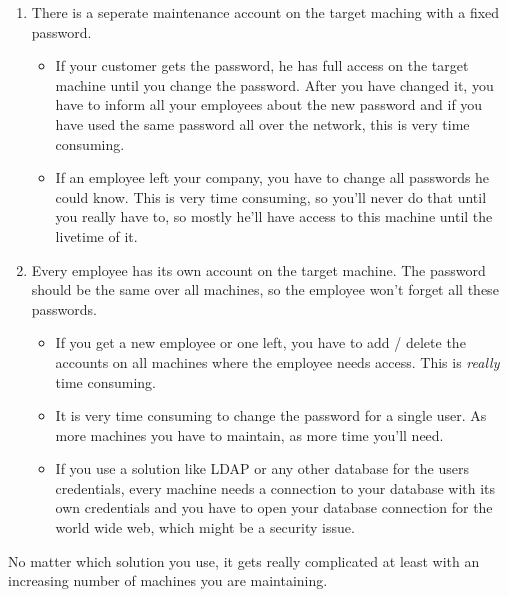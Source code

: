 \begin{enumerate}
	\item There is a seperate maintenance account on the target maching with a
		fixed password.
		\begin{itemize}
			\item If your customer gets the password, he has full access on the
				target machine until you change the password. After you have
				changed it, you have to inform all your employees about the new
				password and if you have used the same password all over the
				network, this is very time consuming.
			\item If an employee left your company, you have to change all
				passwords he could know. This is very time consuming, so you'll
				never do that until you really have to, so mostly he'll have
				access to this machine until the livetime of it.
		\end{itemize}

	\item Every employee has its own account on the target machine. The
		password should be the same over all machines, so the employee won't
		forget all these passwords.
		\begin{itemize}
			\item If you get a new employee or one left, you have to add /
				delete the accounts on all machines where the employee needs
				access. This is \textit{really} time consuming.
			\item It is very time consuming to change the password for a single
				user. As more machines you have to maintain, as more time you'll
				need.
			\item If you use a solution like LDAP or any other database for
				the users credentials, every machine needs a connection to your
				database with its own credentials and you have to open your
				database connection for the world wide web, which might be a
				security issue.
		\end{itemize}
\end{enumerate}

No matter which solution you use, it gets really complicated at least with an
increasing number of machines you are maintaining.
